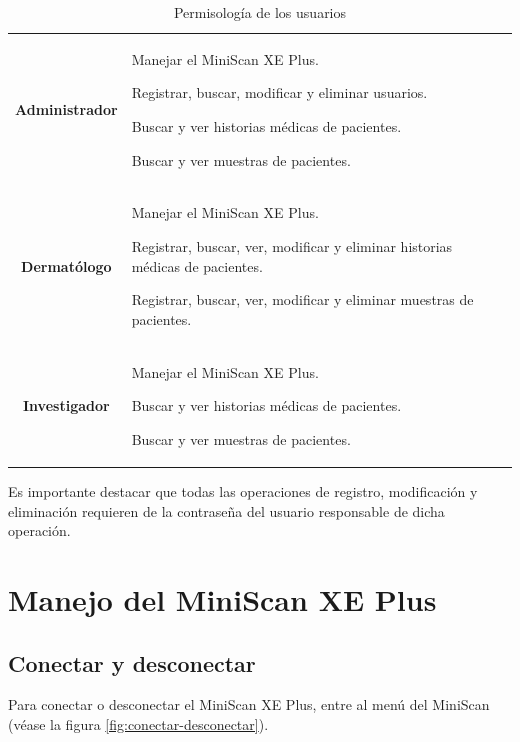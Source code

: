 \begin{table}[h]
		\small
		\caption[]{Permisolog\'{i}a de los usuarios}
		\centering
		\setlength{\extrarowheight}{\altocelda}
		\begin{tabulary}{\anchotabla}{|c|J|}
			\hline
			 & \\ \hline
			
			\textbf{Administrador} &
			
			Manejar el MiniScan XE Plus.
			
			Registrar, buscar, modificar y eliminar usuarios.
			
			Buscar y ver historias m\'{e}dicas de pacientes.
			
			Buscar y ver muestras de pacientes.\\ \hline
			
			\textbf{Dermat\'{o}logo} &
			
			Manejar el MiniScan XE Plus.
			
			Registrar, buscar, ver, modificar y eliminar historias m\'{e}dicas de pacientes.
			
			Registrar, buscar, ver, modificar y eliminar muestras de pacientes.\\ \hline
			
			\textbf{Investigador} &
			
			Manejar el MiniScan XE Plus.
			
			Buscar y ver historias m\'{e}dicas de pacientes.
			
			Buscar y ver muestras de pacientes.\\ \hline
		\end{tabulary}
	\end{table}

	Es importante destacar que todas las operaciones de registro, modificaci\'{o}n y eliminaci\'{o}n requieren de la contrase\~{n}a del usuario responsable de dicha operaci\'{o}n.
	
\newpage

\section*{Manejo del MiniScan XE Plus}

	\subsection*{Conectar y desconectar}
		Para conectar o desconectar el MiniScan XE Plus, entre al men\'{u} del MiniScan (v\'{e}ase la figura \ref{fig:conectar-desconectar}).


